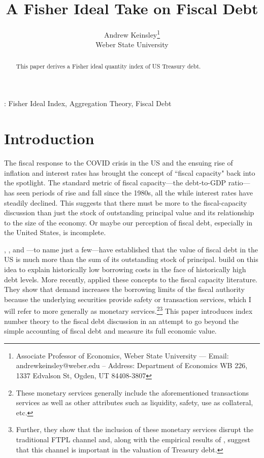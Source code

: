 \documentclass[11pt,a4paper,margin=1.5in]{article}
\title{A Fisher Ideal Take on Fiscal Debt}
\author{Andrew Keinsley\thanks{Associate Professor of Economics, Weber State University --- Email: andrewkeinsley@weber.edu -- Address: Department of Economics WB 226, 1337 Edvalson St, Ogden, UT 84408-3807 } \\  {\small Weber State University}}
\begin{document}
\maketitle
\thispagestyle{empty}

\begin{abstract}
\noindent This paper derives a Fisher ideal quantity index of US Treasury debt.

\end{abstract}
\vspace{2em}

: Fisher Ideal Index, Aggregation Theory, Fiscal Debt
\newpage
\setcounter{page}{1}


\section{Introduction}

The fiscal response to the COVID crisis in the US and the ensuing rise of inflation and interest rates has brought the concept of ``fiscal capacity" back into the spotlight. 
The standard metric of fiscal capacity---the debt-to-GDP ratio---has seen periods of rise and fall since the 1980s, all the while interest rates have steadily declined.
This suggests that there must be more to the fiscal-capacity discussion than just the stock of outstanding principal value and its relationship to the size of the economy.
Or maybe our perception of fiscal debt, especially in the United States, is incomplete.

\citet{Krishnamurthy-VissingJorgensen:2012}, \citet{Krishnamurthy-VissingJorgensen:2013}, and \citet{Nagel:2016}---to name just a few---have established that the value of fiscal debt in the US is much more than the sum of its outstanding stock of principal. 
\citet*{Caballero-Farhi-Gourinchas:2017} build on this idea to explain historically low borrowing costs in the face of historically high debt levels.
More recently, \citet*{Brunnermeier-Merkel-Sannikov:2022} applied these concepts to the fiscal capacity literature. 
They show that demand increases the borrowing limits of the fiscal authority because the underlying securities provide safety or transaction services, which I will refer to more generally as monetary services.\footnote{
	These monetary services generally include the aforementioned transactions services as well as other attributes such as liquidity, safety, use as collateral, etc.}\footnote{
		Further, they show that the inclusion of these monetary services disrupt the traditional FTPL channel \citep[see][as a seminal example]{Leeper:1991} and, along with the empirical results of \citet{Jiang-etal:2019}, suggest that this channel is important in the valuation of Treasury debt. 
	}
This paper introduces index number theory to the fiscal debt discussion in an attempt to go beyond the simple accounting of fiscal debt and measure its full economic value.
\end{document}
